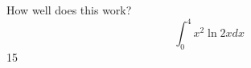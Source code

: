 \documentclass{article}
\begin{document}
How well does this work?
$$\int_0^4 x^2 \ln{2x}dx$$
15
\end{document}
